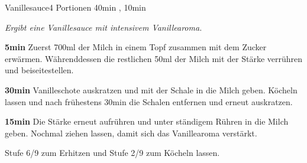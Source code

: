 \documentclass[../recipe-collections/cooking.tex]{subfiles}
\begin{document}
\begin{recipe}{Vanillesauce}{4 Portionen }{40min , 10min }

  \freeform{}\textit{Ergibt eine Vanillesauce mit intensivem Vanillearoma.}


  \textbf{5min}
  Zuerst 700ml der Milch in einem Topf zusammen mit dem Zucker erwärmen.
  Währenddessen die restlichen 50ml der Milch mit der Stärke verrühren und beiseitestellen.


  \textbf{30min}
  Vanilleschote auskratzen und mit der Schale in die Milch geben.
  Köcheln lassen und nach frühestens 30min die Schalen entfernen und erneut auskratzen.

  \newstep{}\textbf{15min}
  Die Stärke erneut aufrühren und unter ständigem Rühren in die Milch geben.
  Nochmal ziehen lassen, damit sich das Vanillearoma verstärkt.

  \freeform{}\hrulefill{}

  \freeform{}
  Stufe 6/9 zum Erhitzen und Stufe 2/9 zum Köcheln lassen.

\end{recipe}
\end{document}
